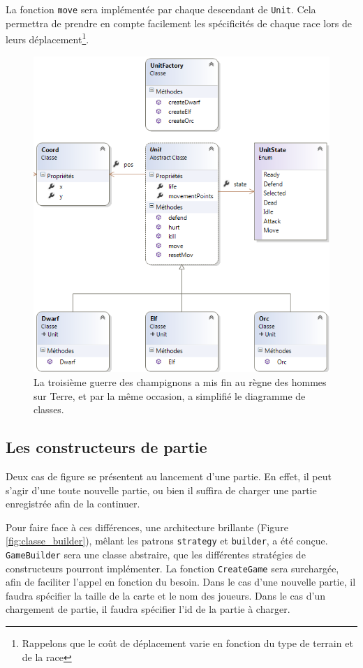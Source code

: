 		La fonction \verb|move| sera implémentée par chaque descendant de \verb|Unit|. Cela permettra de prendre en compte facilement les spécificités de chaque race lors de leurs déplacement\footnote{Rappelons que le coût de déplacement varie en fonction du type de terrain et de la race}.

		\begin{figure}[h!]
			\begin{center}
				\includegraphics[width=1\textwidth]{figure/classe_unit.png}
			\end{center}
			\caption{La troisième guerre des champignons a mis fin au règne des hommes sur Terre, et par la même occasion, a simplifié le diagramme de classes.}
			\label{fig:unit}
		\end{figure}


	\subsection{Les constructeurs de partie}
		\label{sec:constructeurs}
		Deux cas de figure se présentent au lancement d'une partie. En effet, il peut s'agir d'une toute nouvelle partie, ou bien il suffira de charger une partie enregistrée afin de la continuer.

		Pour faire face à ces différences, une architecture brillante (Figure \ref{fig:classe_builder}), mêlant les patrons \verb|strategy| et \verb|builder|, a été conçue.
		\verb|GameBuilder| sera une classe abstraire, que les différentes stratégies de constructeurs pourront implémenter.
		La fonction \verb|CreateGame| sera surchargée, afin de faciliter l'appel en fonction du besoin. Dans le cas d'une nouvelle partie, il faudra spécifier la taille de la carte et le nom des joueurs. Dans le cas d'un chargement de partie, il faudra spécifier l'id de la partie à charger.

